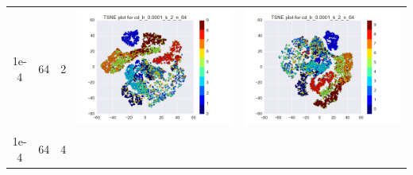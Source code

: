 \documentclass[12pt]{report}
\begin{document}
\begin{table}[H]
\begin{tabular}{ | c | c | c | c || c |}
\begin{minipage}{.3\textwidth}
    \end{minipage}
    \\ \hline
    1e-4 & 64 & 2 &
    \begin{minipage}{.3\textwidth}
      \includegraphics[scale=0.25]{cd_lr_0_0001_k_2_n_64.png}
    \end{minipage} &
    \begin{minipage}{.3\textwidth}
      \includegraphics[scale=0.25]{test_cd_lr_0_0001_k_2_n_64.png}
    \end{minipage}
    \\ \hline
    1e-4 & 64 & 4 &
    \begin{minipage}{.3\textwidth}

\end{minipage}
\end{tabular}
\end{table}
\end{document}
